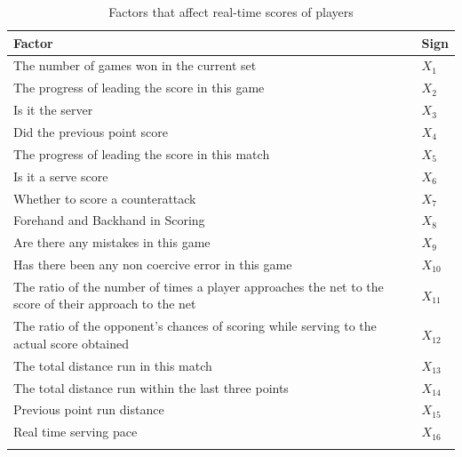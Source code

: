 \documentclass{mcmthesis}
\begin{document}
\begin{longtable}[c]{ll}
	\hline
	\textbf{Factor}                                                                                                 & \textbf{Sign} \\ \hline
	\endfirsthead
	\endhead
	The number of games won in the current set                                                             & $X_1$   \\ \hline
	The progress of leading the score in this game                                                         & $X_2$   \\ \hline
	Is it the server                                                                                       & $X_3$   \\ \hline
	Did the previous point score                                                                           & $X_4$   \\ \hline
	The progress of leading the score in this match                                                        & $X_5$   \\ \hline
	Is it a serve score                                                                                    & $X_6$   \\ \hline
	Whether to score a counterattack                                                                       & $X_7$   \\ \hline
	Forehand and Backhand in Scoring                                                                       & $X_8$   \\ \hline
	Are there any mistakes in this game                                                                    & $X_9$   \\ \hline
	Has there been any non coercive error in this game                                                     & $X_{10}$  \\ \hline
	The ratio of the number of times a player approaches the net to the score of their approach to the net & $X_{11}$  \\ \hline
	The ratio of the opponent's chances of scoring while serving to the actual score obtained              & $X_{12}$  \\ \hline
	The total distance run in this match                                                                   & $X_{13}$  \\ \hline
	The total distance run within the last three points                                                    & $X_{14}$  \\ \hline
	Previous point run distance                                                                            & $X_{15}$  \\ \hline
	Real time serving pace                                                                                 & $X_{16}$  \\ \hline
	\caption{Factors that affect real-time scores of players}
	\label{tab:my-table}
\end{longtable}
\end{document}
